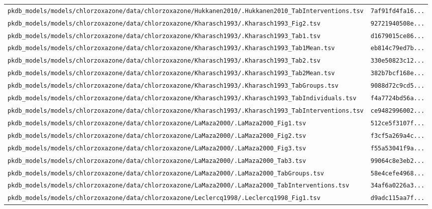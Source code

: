 \documentclass{article}
\begin{document}
\begin{longtable}{ll}
\texttt{pkdb\_models/models/chlorzoxazone/data/chlorzoxazone/Hukkanen2010/.Hukkanen2010\_TabInterventions.tsv} & \texttt{7af91fd4fa16...} \\
\texttt{pkdb\_models/models/chlorzoxazone/data/chlorzoxazone/Kharasch1993/.Kharasch1993\_Fig2.tsv} & \texttt{92721940508e...} \\
\texttt{pkdb\_models/models/chlorzoxazone/data/chlorzoxazone/Kharasch1993/.Kharasch1993\_Tab1.tsv} & \texttt{d1679015ce86...} \\
\texttt{pkdb\_models/models/chlorzoxazone/data/chlorzoxazone/Kharasch1993/.Kharasch1993\_Tab1Mean.tsv} & \texttt{eb814c79ed7b...} \\
\texttt{pkdb\_models/models/chlorzoxazone/data/chlorzoxazone/Kharasch1993/.Kharasch1993\_Tab2.tsv} & \texttt{330e50823c12...} \\
\texttt{pkdb\_models/models/chlorzoxazone/data/chlorzoxazone/Kharasch1993/.Kharasch1993\_Tab2Mean.tsv} & \texttt{382b7bcf168e...} \\
\texttt{pkdb\_models/models/chlorzoxazone/data/chlorzoxazone/Kharasch1993/.Kharasch1993\_TabGroups.tsv} & \texttt{9088d72c9cd5...} \\
\texttt{pkdb\_models/models/chlorzoxazone/data/chlorzoxazone/Kharasch1993/.Kharasch1993\_TabIndividuals.tsv} & \texttt{f4a7724bd56a...} \\
\texttt{pkdb\_models/models/chlorzoxazone/data/chlorzoxazone/Kharasch1993/.Kharasch1993\_TabInterventions.tsv} & \texttt{ce9482996002...} \\
\texttt{pkdb\_models/models/chlorzoxazone/data/chlorzoxazone/LaMaza2000/.LaMaza2000\_Fig1.tsv} & \texttt{512ce5f3107f...} \\
\texttt{pkdb\_models/models/chlorzoxazone/data/chlorzoxazone/LaMaza2000/.LaMaza2000\_Fig2.tsv} & \texttt{f3cf5a269a4c...} \\
\texttt{pkdb\_models/models/chlorzoxazone/data/chlorzoxazone/LaMaza2000/.LaMaza2000\_Fig3.tsv} & \texttt{f55a53041f9a...} \\
\texttt{pkdb\_models/models/chlorzoxazone/data/chlorzoxazone/LaMaza2000/.LaMaza2000\_Tab3.tsv} & \texttt{99064c8e3eb2...} \\
\texttt{pkdb\_models/models/chlorzoxazone/data/chlorzoxazone/LaMaza2000/.LaMaza2000\_TabGroups.tsv} & \texttt{58e4cefe4968...} \\
\texttt{pkdb\_models/models/chlorzoxazone/data/chlorzoxazone/LaMaza2000/.LaMaza2000\_TabInterventions.tsv} & \texttt{34af6a0226a3...} \\
\texttt{pkdb\_models/models/chlorzoxazone/data/chlorzoxazone/Leclercq1998/.Leclercq1998\_Fig1.tsv} & \texttt{d9adc115aa7f...} \\

\end{longtable}
\end{document}
